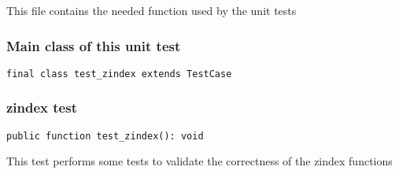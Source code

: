 \documentclass[a4paper]{article}
\begin{document}
This file contains the needed function used by the unit tests

\hypertarget{toc469}{}
\subsubsection{Main class of this unit test}

\begin{lstlisting}
final class test_zindex extends TestCase
\end{lstlisting}

\hypertarget{toc470}{}
\subsubsection{zindex test}

\begin{lstlisting}
public function test_zindex(): void
\end{lstlisting}

This test performs some tests to validate the correctness
of the zindex functions

\end{document}
